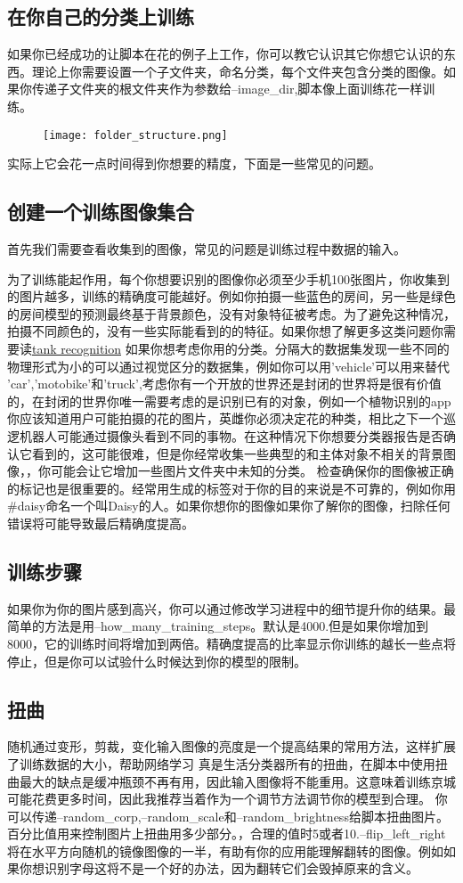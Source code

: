 \subsection{在你自己的分类上训练}
如果你已经成功的让脚本在花的例子上工作，你可以教它认识其它你想它认识的东西。理论上你需要设置一个子文件夹，命名分类，每个文件夹包含分类的图像。如果你传递子文件夹的根文件夹作为参数给--image\_dir,脚本像上面训练花一样训练。
\begin{center}
\begin{figure}
\texttt{[image: folder\_structure.png]}
\end{figure}
\end{center}
实际上它会花一点时间得到你想要的精度，下面是一些常见的问题。
\subsection{创建一个训练图像集合}
首先我们需要查看收集到的图像，常见的问题是训练过程中数据的输入。

为了训练能起作用，每个你想要识别的图像你必须至少手机100张图片，你收集到的图片越多，训练的精确度可能越好。例如你拍摄一些蓝色的房间，另一些是绿色的房间模型的预测最终基于背景颜色，没有对象特征被考虑。为了避免这种情况，拍摄不同颜色的，没有一些实际能看到的的特征。如果你想了解更多这类问题你需要读\href{http://www.jefftk.com/p/detecting-tanks}{tank recognition}
如果你想考虑你用的分类。分隔大的数据集发现一些不同的物理形式为小的可以通过视觉区分的数据集，例如你可以用'vehicle'可以用来替代
'car','motobike'和'truck',考虑你有一个开放的世界还是封闭的世界将是很有价值的，在封闭的世界你唯一需要考虑的是识别已有的对象，例如一个植物识别的app你应该知道用户可能拍摄的花的图片，英雌你必须决定花的种类，相比之下一个巡逻机器人可能通过摄像头看到不同的事物。在这种情况下你想要分类器报告是否确认它看到的，这可能很难，但是你经常收集一些典型的和主体对象不相关的背景图像，，你可能会让它增加一些图片文件夹中未知的分类。
检查确保你的图像被正确的标记也是很重要的。经常用生成的标签对于你的目的来说是不可靠的，例如你用\#daisy命名一个叫Daisy的人。如果你想你的图像如果你了解你的图像，扫除任何错误将可能导致最后精确度提高。
\subsection{训练步骤}
如果你为你的图片感到高兴，你可以通过修改学习进程中的细节提升你的结果。最简单的方法是用--how\_many\_training\_steps。默认是4000.但是如果你增加到8000，它的训练时间将增加到两倍。精确度提高的比率显示你训练的越长一些点将停止，但是你可以试验什么时候达到你的模型的限制。
\subsection{扭曲}
随机通过变形，剪裁，变化输入图像的亮度是一个提高结果的常用方法，这样扩展了训练数据的大小，帮助网络学习
真是生活分类器所有的扭曲，在脚本中使用扭曲最大的缺点是缓冲瓶颈不再有用，因此输入图像将不能重用。这意味着训练京城可能花费更多时间，因此我推荐当着作为一个调节方法调节你的模型到合理。
你可以传递--random\_corp,--random\_scale和--random\_brightness给脚本扭曲图片。百分比值用来控制图片上扭曲用多少部分。，合理的值时5或者10.--flip\_left\_right将在水平方向随机的镜像图像的一半，有助有你的应用能理解翻转的图像。例如如果你想识别字母这将不是一个好的办法，因为翻转它们会毁掉原来的含义。
